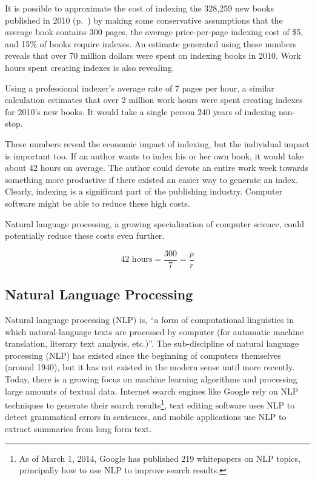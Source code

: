 It is possible to approximate the cost of indexing the 328,259 new books published in 2010 (p.~\pageref{fig:new-books}) by making some conservative assumptions that the average book contains 300 pages, the average price-per-page indexing cost of \$5, and 15\% of books require indexes.
An estimate generated using these numbers reveals that over 70 million dollars were spent on indexing books in 2010. Work hours spent creating indexes is also revealing.

Using a professional indexer's average rate of 7 pages per hour, a similar calculation estimates that over 2 million work hours were spent creating indexes for 2010's new books. It would take a single person 240 years of indexing non-stop.

These numbers reveal the economic impact of indexing, but the individual impact is important too.
If an author wants to index his or her own book, it would take about 42 hours on average. The author could devote an entire work week towards something more productive if there existed an easier way to generate an index.
Clearly, indexing is a significant part of the publishing industry.
Computer software might be able to reduce these high costs.

Natural language processing, a growing specialization of computer science, could potentially reduce these costs even further.

\begin{figure}
$$ 42 \text{ hours} = \frac{300}{7} = \frac{p}{r}$$
\end{figure}

\subsection{Natural Language Processing}

Natural language processing (NLP) is, ``a form of computational linguistics in which natural-language texts are processed by computer (for automatic machine translation, literary text analysis, etc.)''\cite{oed-nlp}.
The sub-discipline of natural language processing (NLP) has existed since the beginning of computers themselves (around 1940), but it has not existed in the modern sense until more recently.
Today, there is a growing focus on machine learning algorithms and processing large amounts of textual data\cite{jurafsky}.
Internet search engines like Google rely on NLP techniques to generate their search results\footnote{As of March 1, 2014, Google has published 219 whitepapers on NLP topics, principally how to use NLP to improve search results.\cite{google-nlp}}, text editing software uses NLP to detect grammatical errors in sentences\cite{norvig}, and mobile applications use NLP to extract summaries from long form text\cite{bit-of-news}.



